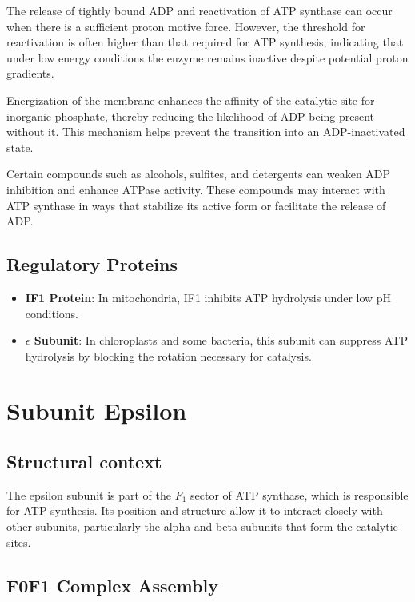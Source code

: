 \documentclass{article}
\begin{document}
The release of tightly bound ADP and reactivation of ATP synthase can occur when there is a sufficient proton motive force. However, the threshold for reactivation is often higher than that required for ATP synthesis, indicating that under low energy conditions the enzyme remains inactive despite potential proton gradients.

Energization of the membrane enhances the affinity of the catalytic site for inorganic phosphate, thereby reducing the likelihood of ADP being present without it. This mechanism helps prevent the transition into an ADP-inactivated state.

Certain compounds such as alcohols, sulfites, and detergents can weaken ADP inhibition and enhance ATPase activity. These compounds may interact with ATP synthase in ways that stabilize its active form or facilitate the release of ADP.

\subsection{Regulatory Proteins}

\begin{itemize}
    \item  \textbf{IF1 Protein}: In mitochondria, IF1 inhibits ATP hydrolysis under low pH conditions.
    \item \textbf{$\epsilon$ Subunit}: In chloroplasts and some bacteria, this subunit can suppress ATP hydrolysis by blocking the rotation necessary for catalysis.
\end{itemize}

\section{Subunit Epsilon}

\subsection{Structural context}

The epsilon subunit is part of the \textit{$F_1$} sector of ATP synthase, which is responsible for ATP synthesis. Its position and structure allow it to interact closely with other subunits, particularly the alpha and beta subunits that form the catalytic sites.

\subsection{F0F1 Complex Assembly}
\end{document}
